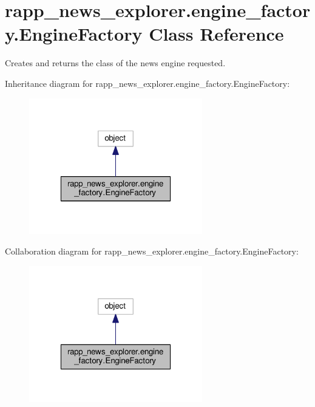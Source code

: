 \hypertarget{classrapp__news__explorer_1_1engine__factory_1_1EngineFactory}{\section{rapp\-\_\-news\-\_\-explorer.\-engine\-\_\-factory.\-Engine\-Factory Class Reference}
\label{classrapp__news__explorer_1_1engine__factory_1_1EngineFactory}
}


Creates and returns the class of the news engine requested.  




Inheritance diagram for rapp\-\_\-news\-\_\-explorer.\-engine\-\_\-factory.\-Engine\-Factory\-:
\nopagebreak
\begin{figure}[H]
\begin{center}
\leavevmode
\includegraphics[width=214pt]{classrapp__news__explorer_1_1engine__factory_1_1EngineFactory__inherit__graph}
\end{center}
\end{figure}


Collaboration diagram for rapp\-\_\-news\-\_\-explorer.\-engine\-\_\-factory.\-Engine\-Factory\-:
\nopagebreak
\begin{figure}[H]
\begin{center}
\leavevmode
\includegraphics[width=214pt]{classrapp__news__explorer_1_1engine__factory_1_1EngineFactory__coll__graph}
\end{center}
\end{figure}
